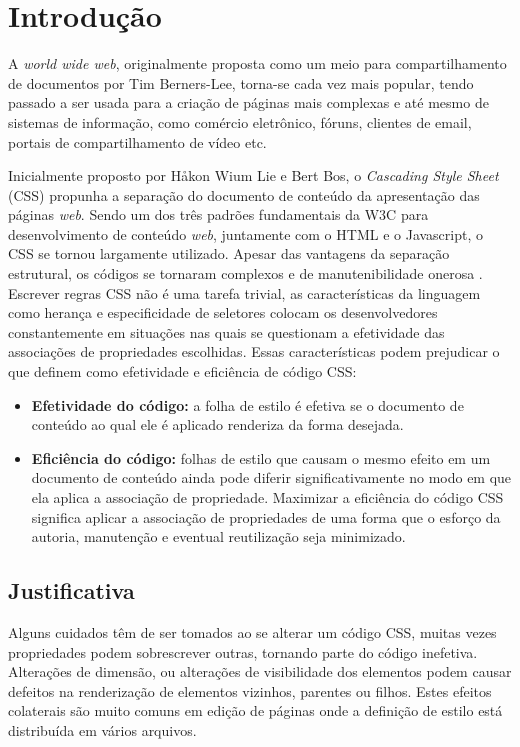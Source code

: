 %
%

\chapter{Introdução}\label{chap:introducao}
\label{chap:intro}

A \textit{world wide web}, originalmente proposta como um meio para compartilhamento de documentos por Tim Berners-Lee, torna-se cada vez mais popular, tendo passado a ser usada para a criação de páginas mais complexas e até mesmo de sistemas de informação, como comércio eletrônico, fóruns, clientes de email, portais de compartilhamento de vídeo etc.

Inicialmente proposto  por Håkon Wium Lie e Bert Bos, o \textit{Cascading Style Sheet} (CSS) propunha a separação do documento de conteúdo da apresentação das páginas \textit{web}. Sendo um dos três padrões fundamentais da W3C para desenvolvimento de conteúdo \textit{web}, juntamente com o HTML e o Javascript, o CSS se tornou largamente utilizado. Apesar das vantagens da separação estrutural, os códigos se tornaram complexos e de manutenibilidade onerosa \cite{Mesbah2012}. Escrever regras CSS não é uma tarefa trivial, as características da linguagem como herança e especificidade de seletores colocam os desenvolvedores constantemente em situações nas quais se questionam a efetividade das associações de propriedades escolhidas. Essas características podem prejudicar o que  definem como efetividade e eficiência de código CSS:

\begin{itemize}
	\item\textbf{Efetividade do código:} a folha de estilo é efetiva se o documento de conteúdo ao qual ele é aplicado renderiza da forma desejada.
	
	\item\textbf{Eficiência do código:} folhas de estilo que causam o mesmo efeito em um documento de conteúdo ainda pode diferir significativamente no modo em que ela aplica a associação de propriedade. Maximizar a eficiência do código CSS significa aplicar a associação de propriedades de uma forma que o esforço da autoria, manutenção e eventual reutilização seja minimizado.
\end{itemize}


\section{Justificativa}
Alguns cuidados têm de ser tomados ao se alterar um código CSS, muitas vezes propriedades podem sobrescrever outras, tornando parte do código inefetiva. Alterações de dimensão, ou alterações de visibilidade dos elementos podem causar defeitos na renderização de elementos vizinhos, parentes ou filhos. Estes efeitos colaterais são muito comuns em edição de páginas onde a definição de estilo está distribuída em vários arquivos.

